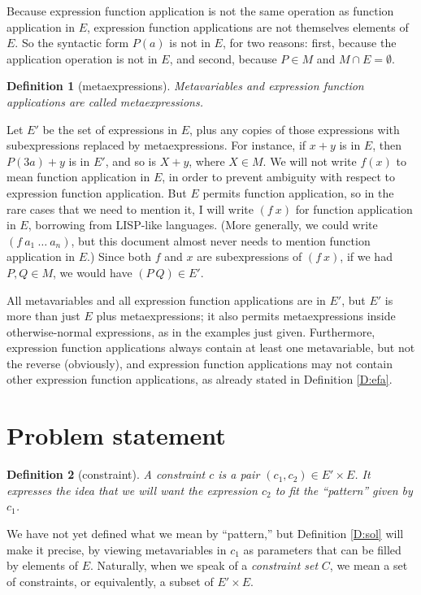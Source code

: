 \documentclass{article}
\newtheorem{dfn}{Definition}
\begin{document}
Because expression function application is not the same operation as function application in $E$, expression function applications are not themselves elements of $E$.  So the syntactic form $P(a)$ is not in $E$, for two reasons:  first, because the application operation is not in $E$, and second, because $P\in M$ and $M\cap E=\emptyset$.

\begin{dfn}[metaexpressions]
Metavariables and expression function applications are called \emph{metaexpressions}.
\end{dfn}

Let $E'$ be the set of expressions in $E$, plus any copies of those expressions with subexpressions replaced by metaexpressions.  For instance, if $x+y$ is in $E$, then $P(3a)+y$ is in $E'$, and so is $X+y$, where $X\in M$.  We will not write $f(x)$ to mean function application in $E$, in order to prevent ambiguity with respect to expression function application.  But $E$ permits function application, so in the rare cases that we need to mention it, I will write $(f~x)$ for function application in $E$, borrowing from LISP-like languages.  (More generally, we could write $(f~a_1~\ldots~a_n)$, but this document almost never needs to mention function application in $E$.)  Since both $f$ and $x$ are subexpressions of $(f~x)$, if we had $P,Q\in M$, we would have $(P~Q)\in E'$.

All metavariables and all expression function applications are in $E'$, but $E'$ is more than just $E$ plus metaexpressions; it also permits metaexpressions inside otherwise-normal expressions, as in the examples just given.  Furthermore, expression function applications always contain at least one metavariable, but not the reverse (obviously), and expression function applications may not contain other expression function applications, as already stated in Definition \ref{D:efa}.

\section{Problem statement}%

\begin{dfn}[constraint]
A \emph{constraint} $c$ is a pair $(c_1,c_2)\in E'\times E$.  It expresses the idea that we will want the expression $c_2$ to fit the ``pattern'' given by $c_1$.
\end{dfn}

We have not yet defined what we mean by ``pattern,'' but Definition \ref{D:sol} will make it precise, by viewing metavariables in $c_1$ as parameters that can be filled by elements of $E$.  Naturally, when we speak of a \emph{constraint set} $C$, we mean a set of constraints, or equivalently, a subset of $E'\times E$.
\end{document}
